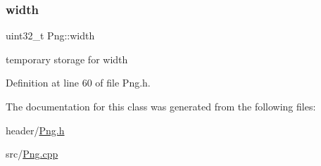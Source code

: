 \subsubsection{\texorpdfstring{width}{width}}
{\footnotesize\ttfamily uint32\+\_\+t Png\+::width\hspace{0.3cm}{\ttfamily [private]}}

temporary storage for width 

Definition at line 60 of file Png.\+h.



The documentation for this class was generated from the following files\+:\begin{DoxyCompactItemize}
\item 
header/\mbox{\hyperlink{Png_8h}{Png.\+h}}\item 
src/\mbox{\hyperlink{Png_8cpp}{Png.\+cpp}}\end{DoxyCompactItemize}
